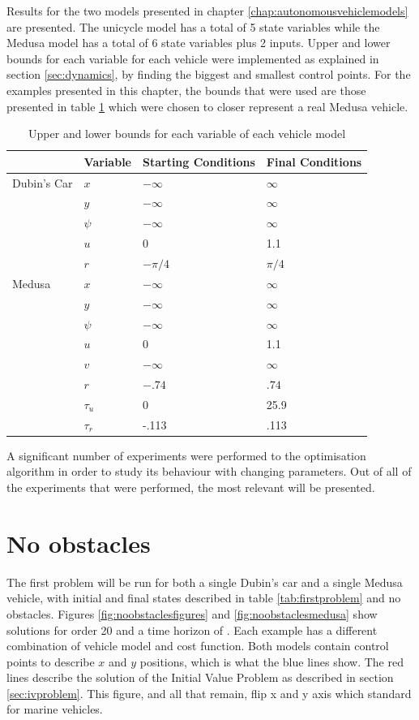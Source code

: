 \par Results for the two models presented in chapter \ref{chap:autonomousvehiclemodels} are presented. The unicycle model has a total of 5 state variables while the Medusa model has a total of 6 state variables plus 2 inputs. Upper and lower bounds for each variable for each vehicle were implemented as explained in section \ref{sec:dynamics}, by finding the biggest and smallest control points. For the examples presented in this chapter, the bounds that were used are those presented in table \ref{tab:variablebounds} which were chosen to closer represent a real Medusa vehicle.
\begin{table}[h!]
\centering
\begin{tabular}{|l|l|l|l|}
\hline
& Variable & Starting Conditions & Final Conditions \\ \hline
Dubin's Car & $x$ & $-\infty$ & $\infty$ \\
& $y$ & $-\infty$ & $\infty$ \\
& $\psi$ & $-\infty$ & $\infty$ \\
& $u$ & 0 & 1.1 \\
& $r$ & $-\pi/4$ & $\pi/4$ \\ \hline
Medusa & $x$ & $-\infty$ & $\infty$ \\
& $y$ & $-\infty$ & $\infty$ \\
& $\psi$ & $-\infty$ & $\infty$ \\
& $u$ & 0 & 1.1 \\
& $v$ & $-\infty$ & $\infty$ \\
& $r$ & $-.74$ & $.74$ \\
& $\tau_u$ & 0 & 25.9 \\
& $\tau_r$ & -.113 & .113 \\
\hline
\end{tabular}
\caption{Upper and lower bounds for each variable of each vehicle model}
\label{tab:variablebounds}
\end{table}

\par A significant number of experiments were performed to the optimisation algorithm in order to study its behaviour with changing parameters. Out of all of the experiments that were performed, the most relevant will be presented.

\section{No obstacles}

\par The first problem will be run for both a single Dubin's car and a single Medusa vehicle, with initial and final states described in table \ref{tab:firstproblem} and no obstacles. Figures \ref{fig:noobstaclesfigures} and \ref{fig:noobstaclesmedusa} show solutions for order 20 and a time horizon of . Each example has a different combination of vehicle model and cost function. Both models contain control points to describe $x$ and $y$ positions, which is what the blue lines show. The red lines describe the solution of the Initial Value Problem as described in section \ref{sec:ivproblem}. This figure, and all that remain, flip x and y axis which standard for marine vehicles.

